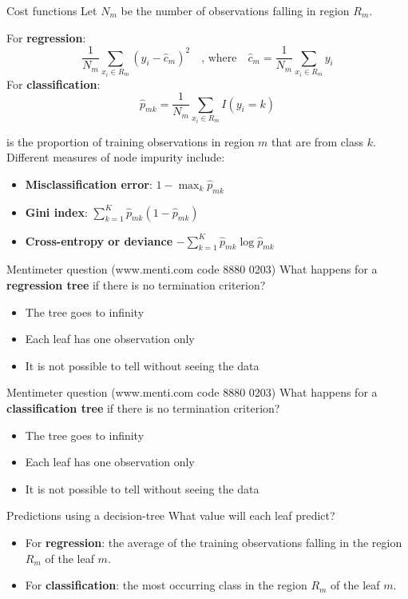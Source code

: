 \documentclass[notes]{beamer}          %
\begin{document}
\begin{frame}{Cost functions}
Let $N_m$ be the number of observations falling in region $R_m$.

For \textbf{regression}:
$$\dfrac{1}{N_m}\sum_{x_i\in R_m}(y_i-\hat c_m)^2  \quad \mbox{, where} \quad \hat c_m = \dfrac{1}{N_m}\sum_{x_i\in R_m}y_i$$
For \textbf{classification}:
\begin{equation*}
	\hat{p}_{mk}=\dfrac{1}{N_m}\sum_{x_i\in R_m}I(y_i=k)
\end{equation*}

is the proportion of training observations in region $m$ that are from class $k$. Different measures of node impurity include:
\begin{itemize}
\item  \textbf{Misclassification error}: $1-\max_k \hat{p}_{mk}$
\item  \textbf{Gini index}: $\sum_{k=1}^K\hat{p}_{mk}(1-\hat{p}_{mk})$
\item  \textbf{Cross-entropy or deviance} $-\sum_{k=1}^K\hat{p}_{mk}\log\hat{p}_{mk}$
\end{itemize}
\end{frame}

\begin{frame}{Mentimeter question (www.menti.com code 8880 0203)}
What happens for a \textbf{regression tree} if there is no termination criterion?
\begin{itemize}
\item The tree goes to infinity
\item Each leaf has one observation only
\item It is not possible to tell without seeing the data
\end{itemize}	
\end{frame}

\begin{frame}{Mentimeter question (www.menti.com code 8880 0203)}
What happens for a \textbf{classification tree} if there is no termination criterion?
\begin{itemize}
\item The tree goes to infinity
\item Each leaf has one observation only
\item It is not possible to tell without seeing the data
\end{itemize}	
\end{frame}



\begin{frame}{Predictions using a decision-tree}
What value will each leaf predict?
\begin{itemize}
	\item For \textbf{regression}: the average of the  training observations falling in the region $R_m$ of the leaf $m$.
		\item For \textbf{classification}: the most occurring class in the region $R_m$ of the leaf $m$.
\end{itemize}

\vspace{0.5cm}

\end{frame}
\end{document}
